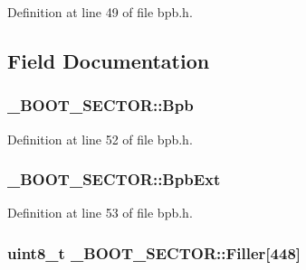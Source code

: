 Definition at line 49 of file bpb.\+h.



\subsection{Field Documentation}
\subsubsection[{\texorpdfstring{Bpb}{Bpb}}]{ \+\_\+\+B\+O\+O\+T\+\_\+\+S\+E\+C\+T\+O\+R\+::\+Bpb}\hypertarget{struct__BOOT__SECTOR_afedc563717fbacc0ce2e3b2fa31384bc}{}\label{struct__BOOT__SECTOR_afedc563717fbacc0ce2e3b2fa31384bc}


Definition at line 52 of file bpb.\+h.

\subsubsection[{\texorpdfstring{Bpb\+Ext}{BpbExt}}]{ \+\_\+\+B\+O\+O\+T\+\_\+\+S\+E\+C\+T\+O\+R\+::\+Bpb\+Ext}\hypertarget{struct__BOOT__SECTOR_ab175294dfdb20919b006865ac486df09}{}\label{struct__BOOT__SECTOR_ab175294dfdb20919b006865ac486df09}


Definition at line 53 of file bpb.\+h.

\subsubsection[{\texorpdfstring{Filler}{Filler}}]{\setlength{\rightskip}{0pt plus 5cm}uint8\+\_\+t \+\_\+\+B\+O\+O\+T\+\_\+\+S\+E\+C\+T\+O\+R\+::\+Filler\mbox{[}448\mbox{]}}\hypertarget{struct__BOOT__SECTOR_abca94a8f55946d277eed33716aa8a612}{}\label{struct__BOOT__SECTOR_abca94a8f55946d277eed33716aa8a612}


